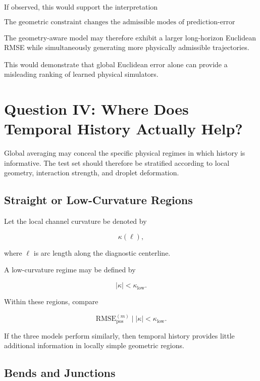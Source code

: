\documentclass[11pt]{article}
\begin{document}
If observed, this would support the interpretation

\begin{equation}
\boxed{
\text{The geometric constraint changes the admissible modes of prediction-error accumulation.}
}
\end{equation}

The geometry-aware model may therefore exhibit a larger long-horizon Euclidean RMSE while simultaneously generating more physically admissible trajectories.

This would demonstrate that global Euclidean error alone can provide a misleading ranking of learned physical simulators.

\section{Question IV: Where Does Temporal History Actually Help?}

Global averaging may conceal the specific physical regimes in which history is informative. The test set should therefore be stratified according to local geometry, interaction strength, and droplet deformation.

\subsection{Straight or Low-Curvature Regions}

Let the local channel curvature be denoted by

\begin{equation}
\kappa(\ell),
\end{equation}

where \(\ell\) is arc length along the diagnostic centerline.

A low-curvature regime may be defined by

\begin{equation}
|\kappa| < \kappa_{\mathrm{low}}.
\end{equation}

Within these regions, compare

\begin{equation}
\mathrm{RMSE}_{\mathrm{pos}}^{(m)}
\mid
|\kappa|<\kappa_{\mathrm{low}}.
\end{equation}

If the three models perform similarly, then temporal history provides little additional information in locally simple geometric regions.

\subsection{Bends and Junctions}
\end{document}
